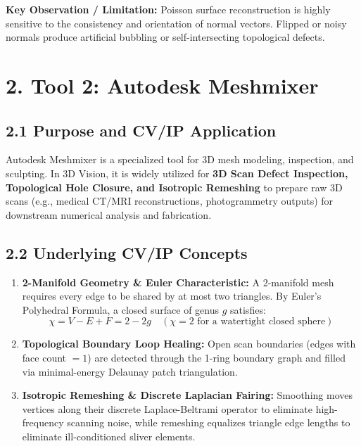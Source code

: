 \documentclass[12pt]{article}
\begin{document}
\textbf{Key Observation / Limitation:} Poisson surface reconstruction is highly sensitive to the consistency and orientation of normal vectors. Flipped or noisy normals produce artificial bubbling or self-intersecting topological defects.

\newpage

\section*{2. Tool 2: Autodesk Meshmixer}

\subsection*{2.1 Purpose and CV/IP Application}
Autodesk Meshmixer is a specialized tool for 3D mesh modeling, inspection, and sculpting. In 3D Vision, it is widely utilized for \textbf{3D Scan Defect Inspection, Topological Hole Closure, and Isotropic Remeshing} to prepare raw 3D scans (e.g., medical CT/MRI reconstructions, photogrammetry outputs) for downstream numerical analysis and fabrication.

\subsection*{2.2 Underlying CV/IP Concepts}
\begin{enumerate}
    \item \textbf{2-Manifold Geometry \& Euler Characteristic:} A 2-manifold mesh requires every edge to be shared by at most two triangles. By Euler's Polyhedral Formula, a closed surface of genus $g$ satisfies:
    \begin{equation}
        \chi = V - E + F = 2 - 2g \quad (\chi = 2 \text{ for a watertight closed sphere})
    \end{equation}
    \item \textbf{Topological Boundary Loop Healing:} Open scan boundaries (edges with face count $= 1$) are detected through the 1-ring boundary graph and filled via minimal-energy Delaunay patch triangulation.
    \item \textbf{Isotropic Remeshing \& Discrete Laplacian Fairing:} Smoothing moves vertices along their discrete Laplace-Beltrami operator to eliminate high-frequency scanning noise, while remeshing equalizes triangle edge lengths to eliminate ill-conditioned sliver elements.
\end{enumerate}
\end{document}
